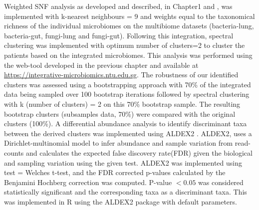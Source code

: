 Weighted SNF analysis as developed and described, in Chapter1 and \cite{Narayana2019}, was implemented with k-nearest neighbours = 9 and weights equal to the taxonomical richness of the individual microbiomes on the multibiome datasets (bacteria-lung, bacteria-gut, fungi-lung and fungi-gut). Following this integration, spectral clustering was implemented with optimum number of clusters=2 to cluster the patients based on the integrated microbiomes. This analysis was performed using the web-tool developed in the previous chapter and available at \url{https://integrative-microbiomics.ntu.edu.sg}. The robustness of our identified clusters was assessed using a bootstrapping approach with 70\% of the integrated data being sampled over 100 bootstrap iterations followed by spectral clustering with k (number of clusters) = 2 on this 70\% bootstrap sample. The resulting bootstrap clusters (subsamples data, 70\%) were compared with the original clusters (100\%). A differential abundance analysis to identify discriminant taxa between the derived clusters was implemented using ALDEX2 \cite{Fernandes2014}. ALDEX2, uses a Dirichlet-multinomial model to infer abundance and sample variation from read-counts and calculates the expected false discovery rate(FDR) given the biological and sampling variation using the given test. ALDEX2 was implemented using test =  Welches t-test, and the FDR corrected p-values calculated by the Benjamini Hochberg correction was computed. P-value $< 0.05$ was considered statistically significant and the corresponding taxa as a discriminant taxa. This was implemented in R using the ALDEX2 package with default parameters.